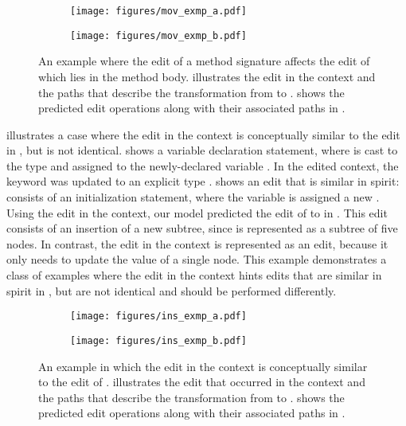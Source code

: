 \begin{figure}[t]
\begin{subfigure}[b]{.49\textwidth}
  \centering
  \texttt{[image: figures/mov\_exmp\_a.pdf]}  
  \caption{}
  \label{Fi:qa_mov_exmp_a}
\end{subfigure}
\begin{subfigure}[b]{.49\textwidth}
  \centering
  \texttt{[image: figures/mov\_exmp\_b.pdf]}  
  \caption{}
  \label{Fi:qa_mov_exmp_b}
\end{subfigure}
\caption{
An example where the edit of a method signature affects the edit of  which lies in the method body.  illustrates the edit in the context and the paths that describe the transformation from  to .  shows the predicted edit operations along with their associated paths in .}
\label{Fi:qa_mov_exmp}
\end{figure} 
 illustrates a case where the edit in the context is conceptually similar to the edit in , but is not identical. 
 shows a variable declaration statement, where  is cast to the type  and assigned to the newly-declared variable . In the edited context, the keyword  was updated to an explicit type . 
 shows an edit that is similar in spirit:  consists of an initialization statement, where the variable  is  assigned a new . Using the edit in the context, our model predicted the edit of  to  in . This edit consists of an insertion of a new subtree, since  is represented as a subtree of five nodes. In contrast, the edit in the context is represented as an \textbf{} edit, because it only needs to update the value of a single node. 
This example demonstrates a class of examples where the edit in the context hints edits that are similar in spirit in , but are not identical and should be performed differently.

\begin{figure}[t]
\begin{subfigure}[b]{.49\textwidth}
  \centering
  \texttt{[image: figures/ins\_exmp\_a.pdf]}  
  \caption{}
  \label{Fi:qa_ins_exmp_a}
\end{subfigure}
\begin{subfigure}[b]{.49\textwidth}
  \centering
  \texttt{[image: figures/ins\_exmp\_b.pdf]}  
  \caption{}
  \label{Fi:qa_ins_exmp_b}
\end{subfigure}
\caption{
An example in which the edit in the context is conceptually similar to the edit of .  illustrates the edit that occurred in the context and the paths that describe the transformation from  to .  shows the predicted edit operations along with their associated paths in .}
\label{Fi:qa_ins_exmp}
\end{figure} 



